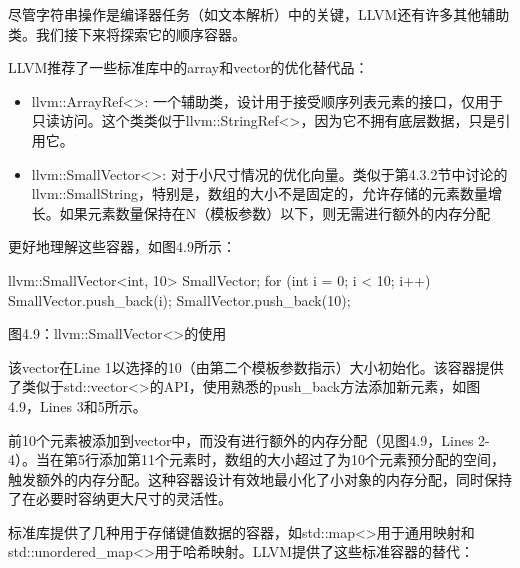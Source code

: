 尽管字符串操作是编译器任务（如文本解析）中的关键，LLVM还有许多其他辅助类。我们接下来将探索它的顺序容器。


LLVM推荐了一些标准库中的array和vector的优化替代品：

\begin{itemize}
\item
llvm::ArrayRef<>: 一个辅助类，设计用于接受顺序列表元素的接口，仅用于只读访问。这个类类似于llvm::StringRef<>，因为它不拥有底层数据，只是引用它。
\item
llvm::SmallVector<>: 对于小尺寸情况的优化向量。类似于第4.3.2节中讨论的llvm::SmallString，特别是，数组的大小不是固定的，允许存储的元素数量增长。如果元素数量保持在N（模板参数）以下，则无需进行额外的内存分配
\end{itemize}

更好地理解这些容器，如图4.9所示：

\begin{cpp}
llvm::SmallVector<int, 10> SmallVector;
for (int i = 0; i < 10; i++) {
  SmallVector.push_back(i);
}
SmallVector.push_back(10);
\end{cpp}

\begin{center}
图4.9：llvm::SmallVector<>的使用
\end{center}

该vector在Line 1以选择的10（由第二个模板参数指示）大小初始化。该容器提供了类似于std::vector<>的API，使用熟悉的push\_back方法添加新元素，如图4.9，Lines 3和5所示。

前10个元素被添加到vector中，而没有进行额外的内存分配（见图4.9，Lines 2-4）。当在第5行添加第11个元素时，数组的大小超过了为10个元素预分配的空间，触发额外的内存分配。这种容器设计有效地最小化了小对象的内存分配，同时保持了在必要时容纳更大尺寸的灵活性。


标准库提供了几种用于存储键值数据的容器，如std::map<>用于通用映射和std::unordered\_map<>用于哈希映射。LLVM提供了这些标准容器的替代：

